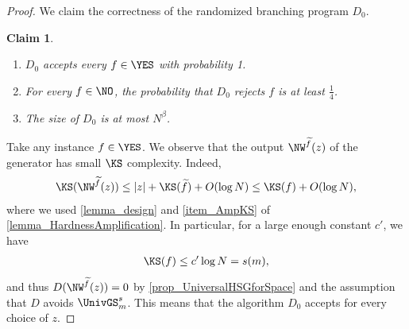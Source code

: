 \documentclass[11pt]{article}
\numberwithin{equation}{section}
\newtheorem{claim}[theorem]{Claim}
\theoremstyle{definition}
\theoremstyle{plain}
\begin{document}
\begin{proof}
  We claim the correctness of the randomized branching program $D_0$.
  \begin{claim}
    \label{claim_RandomizedROBP}
    \hspace{0em}
    \begin{enumerate}
      \item
            $D_0$ accepts every $f \in \YES$ with probability 1.
      \item
            For every $f \in \NO$,
            the probability that $D_0$ rejects $f$ is at least $\frac{1}{4}$.
      \item
            The size of $D_0$ is at most $N^{\beta}$.
    \end{enumerate}
  \end{claim}
  Take any \Yes instance $f \in \YES$.
  We observe that the output $\NW^{\widetilde{f}}(z)$ of the generator has small $\KS$ complexity.
  Indeed,
  \begin{align*}
    \KS(\NW^{{\widetilde{f}}}(z)) \le |z| + \KS({\widetilde{f}}) + O(\log N) \le \KS(f) + O(\log N),
  \end{align*}
  where we used \cref{lemma_design} and \cref{item_AmpKS} of \cref{lemma_HardnessAmplification}.
  In particular, for a large enough constant $c'$, we have
  \begin{align*}
    \KS(f) \le c' \log N = s(m),
  \end{align*}
  and thus $D(\NW^{\widetilde{f}}(z)) = 0$ by \cref{prop_UniversalHSGforSpace} and the assumption that $D$ avoids $\UnivGS_m^s$.
  This means that the algorithm $D_0$ accepts for every choice of $z$.


\end{proof}
\end{document}
